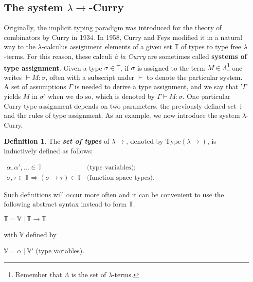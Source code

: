 \documentclass{llncs}
\newcommand{\lambdasystem}[0]{{\lambda}{\rightarrow}}
\newcommand{\myemph}[1]{\textbf{\emph{#1}}}
\theoremstyle{definition}
\newtheorem{mydef}{Definition}
\numberwithin{mydef}{subsection}
\theoremstyle{plain}
\theoremstyle{remark}
\begin{document}
	\subsection{The system $\lambdasystem$-Curry}
	
	Originally, the implicit typing paradigm was introduced for the theory of combinators by Curry in 1934. 
	In 1958, Curry and Feys modified it in a natural way to the $\lambda$-calculus assignment elements of a given set $\mathbb{T}$ of types to type free $\lambda$-terms.
	For this reason, these calculi \textit{à la Curry} are sometimes called \textbf{systems of type assignment}.
	Given a type $\sigma \in \mathbb{T}$, if $\sigma$ is assigned to the term $M \in \Lambda$\footnote{Remember that $\Lambda$ is the set of $\lambda$-terms.} one writes $\vdash M : \sigma$, often with a subscript under $\vdash$ to denote the particular system.
	A set of assumptions $\Gamma$ is needed to derive a type assignment, and we say that '$\Gamma$ yields $M$ in $\sigma$' when we do so, which is denoted by $\Gamma \vdash M : \sigma$.
	One particular Curry type assignment depends on two parameters, the previously defined set $\mathbb{T}$ and the rules of type assignment.
	As an example, we now introduce the system $\lambda$-Curry.
	
	\begin{mydef}
		The \myemph{set of types} of $\lambdasystem$, denoted by $\text{Type} {\left( \lambdasystem \right)}$, is inductively defined as follows:
		\begin{center}
			$\begin{matrix}
				\alpha, \alpha', \dots \in \mathbb{T} & \text{(type variables);} \\ 
				\sigma, \tau \in \mathbb{T} \Rightarrow \left( \sigma \rightarrow \tau \right) \in \mathbb{T} & \text{(function space types).}
			\end{matrix}$
		\end{center}
		Such definitions will occur more often and it can be convenient to use the following abstract syntax instead to form $\mathbb{T}$:
		\begin{center}
			$\mathbb{T} = \mathbb{V} \mid \mathbb{T} \rightarrow \mathbb{T}$
		\end{center}
		with $\mathbb{V}$ defined by
		\begin{center}
			$\mathbb{V} = \alpha \mid \mathbb{V}'$ (type variables). \\
		\end{center}
	\end{mydef}
	
\end{document}
